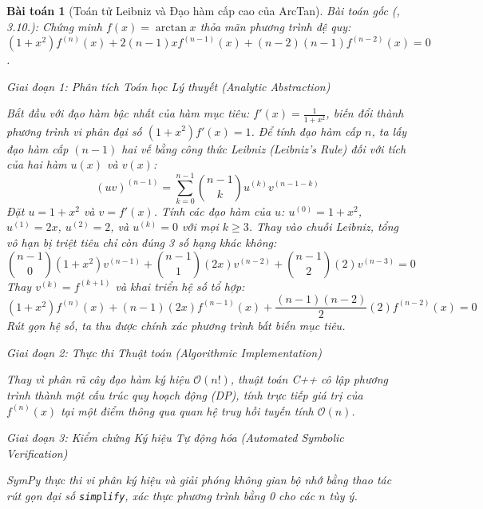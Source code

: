 \documentclass{article}
\newtheorem{baitoan}{Bài toán}
\begin{document}
\begin{baitoan}[Toán tử Leibniz và Đạo hàm cấp cao của ArcTan]
 \emph{Bài toán gốc (\cite{Quoc_Long_Dat_Nam_VMC}, 3.10.):} 
 Chứng minh $f(x) = \arctan x$ thỏa mãn phương trình đệ quy: $(1 + x^2)f^{(n)}(x) + 2(n - 1)xf^{(n-1)}(x) + (n - 2)(n - 1)f^{(n-2)}(x) = 0$.

\vspace{0.5em}\noindent\emph{Giai đoạn 1: Phân tích Toán học Lý thuyết (Analytic Abstraction)}
 
 Bắt đầu với đạo hàm bậc nhất của hàm mục tiêu: $f'(x) = \frac{1}{1+x^2}$, biến đổi thành phương trình vi phân đại số $(1+x^2)f'(x) = 1$. 
 Để tính đạo hàm cấp $n$, ta lấy đạo hàm cấp $(n-1)$ hai vế bằng công thức Leibniz (Leibniz's Rule) đối với tích của hai hàm $u(x)$ và $v(x)$:
 \begin{equation}
 (uv)^{(n-1)} = \sum_{k=0}^{n-1} \binom{n-1}{k} u^{(k)} v^{(n-1-k)}
 \end{equation}
 Đặt $u = 1+x^2$ và $v = f'(x)$. Tính các đạo hàm của $u$:
 $u^{(0)} = 1+x^2$, $u^{(1)} = 2x$, $u^{(2)} = 2$, và $u^{(k)} = 0$ với mọi $k \ge 3$. 
 Thay vào chuỗi Leibniz, tổng vô hạn bị triệt tiêu chỉ còn đúng 3 số hạng khác không:
 \begin{equation}
 \binom{n-1}{0}(1+x^2)v^{(n-1)} + \binom{n-1}{1}(2x)v^{(n-2)} + \binom{n-1}{2}(2)v^{(n-3)} = 0
 \end{equation}
 Thay $v^{(k)} = f^{(k+1)}$ và khai triển hệ số tổ hợp:
 \begin{equation}
 (1+x^2)f^{(n)}(x) + (n-1)(2x)f^{(n-1)}(x) + \frac{(n-1)(n-2)}{2}(2)f^{(n-2)}(x) = 0
 \end{equation}
 Rút gọn hệ số, ta thu được chính xác phương trình bất biến mục tiêu.

\vspace{0.5em}\noindent\emph{Giai đoạn 2: Thực thi Thuật toán (Algorithmic Implementation)}
 
 Thay vì phân rã cây đạo hàm ký hiệu $\mathcal{O}(n!)$, thuật toán C++ cô lập phương trình thành một cấu trúc quy hoạch động (DP), tính trực tiếp giá trị của $f^{(n)}(x)$ tại một điểm thông qua quan hệ truy hồi tuyến tính $\mathcal{O}(n)$.



\vspace{0.5em}\noindent\emph{Giai đoạn 3: Kiểm chứng Ký hiệu Tự động hóa (Automated Symbolic Verification)}
 
 \textsf{SymPy} thực thi vi phân ký hiệu và giải phóng không gian bộ nhớ bằng thao tác rút gọn đại số \texttt{simplify}, xác thực phương trình bằng 0 cho các $n$ tùy ý.


\end{baitoan}
\end{document}
